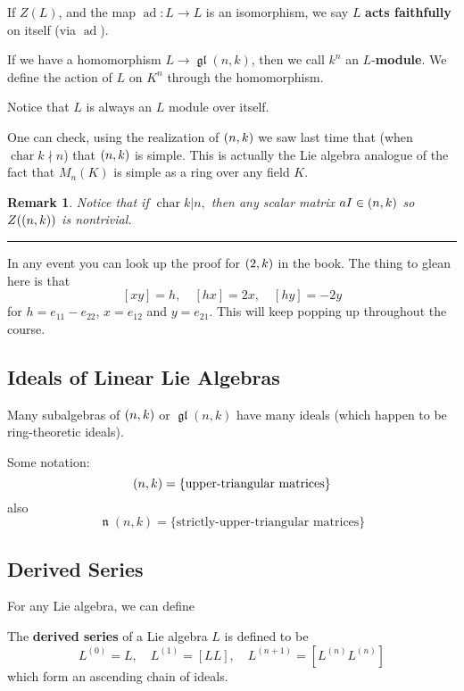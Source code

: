 \documentclass[12pt]{article}
\theoremstyle{nonumberbreak}
\theoremstyle{changebreak}
\theoremstyle{nonumberbreak}
\theoremstyle{change}
\newtheorem{rmk}[thm]{Remark}
\newcommand*{\brk}{
\rule{2in}{.1pt}
}
\DeclareMathOperator{\ch}{char}
\DeclareMathOperator{\gl}{\mathfrak{gl}}
\let\sl\relax
\DeclareMathOperator{\sl}{\mathfrak{sl}}
\DeclareMathOperator{\ad}{ad}
\let\t\relax
\DeclareMathOperator{\t}{\mathfrak{t}}
\DeclareMathOperator{\n}{\mathfrak{n}}
\begin{document}
\begin{defn}
	If $Z(L)$, and the map $\ad:L\to L$ is an isomorphism, we say $L$ \textbf{acts faithfully}
	on itself (via $\ad$).
\end{defn}

\begin{defn}
	If we have a homomorphism $L\to\gl(n,k)$, then we call $k^n$ an $L$-\textbf{module}.
	We define the action of $L$ on $K^n$ through the homomorphism.
\end{defn}

Notice that $L$ is always an $L$ module over itself.

One can check, using the realization of $\sl(n,k)$ we saw last time that (when $\ch k\nmid n$)
that $\sl(n,k)$ is simple. This is actually the Lie algebra analogue of the fact that $M_n(K)$ is simple
as a ring over any field $K$.

\begin{rmk}
	Notice that if $\ch k |n$$,$ then \textit{any} scalar matrix $aI\in\sl(n,k)$
	so $Z(\sl(n,k))$ is nontrivial.
\end{rmk}

\brk

In any event you can look up the proof for $\sl(2,k)$ in the book. The thing to glean here is that
\[[xy]=h,\quad [hx]=2x,\quad [hy]=-2y\]
for $h=e_{11}-e_{22}$, $x=e_{12}$ and $y=e_{21}$. This will keep popping up throughout the course.

\subsection{Ideals of Linear Lie Algebras}
Many subalgebras of $\sl(n,k)$ or $\gl(n,k)$ have many ideals (which happen to be ring-theoretic ideals).

\begin{defn}
	Some notation:
	\[\t(n,k)=\{\text{upper-triangular matrices}\}\] 
	also 
	\[\n(n,k)=\{\text{strictly-upper-triangular matrices}\}\]
\end{defn}

\subsection{Derived Series}
For any Lie algebra, we can define
\begin{defn}
	The \textbf{derived series} of a Lie algebra $L$ is defined to be
	\[L^{(0)}=L,\quad L^{(1)}=[LL],\quad L^{(n+1)}=[L^{(n)}L^{(n)}]\]
	which form an ascending chain of ideals.
\end{defn}
\end{document}
